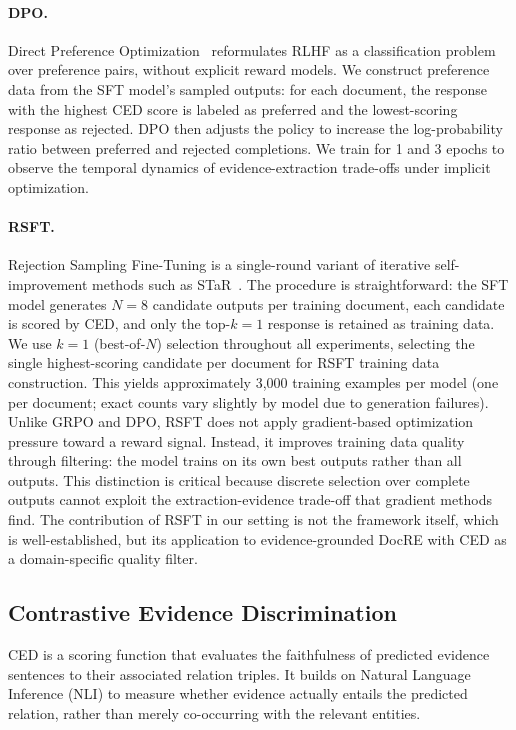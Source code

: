 \paragraph{DPO.}
Direct Preference Optimization~\citep{rafailov2023direct} reformulates RLHF as a classification problem over preference pairs, without explicit reward models. We construct preference data from the SFT model's sampled outputs: for each document, the response with the highest CED score is labeled as preferred and the lowest-scoring response as rejected. DPO then adjusts the policy to increase the log-probability ratio between preferred and rejected completions. We train for 1 and 3 epochs to observe the temporal dynamics of evidence-extraction trade-offs under implicit optimization.

\paragraph{RSFT.}
Rejection Sampling Fine-Tuning is a single-round variant of iterative self-improvement methods such as STaR~\citep{zelikman2022star}. The procedure is straightforward: the SFT model generates $N{=}8$ candidate outputs per training document, each candidate is scored by CED, and only the top-$k{=}1$ response is retained as training data. We use $k{=}1$ (best-of-$N$) selection throughout all experiments, selecting the single highest-scoring candidate per document for RSFT training data construction. This yields approximately 3,000 training examples per model (one per document; exact counts vary slightly by model due to generation failures). Unlike GRPO and DPO, RSFT does not apply gradient-based optimization pressure toward a reward signal. Instead, it improves training data quality through filtering: the model trains on its own best outputs rather than all outputs. This distinction is critical because discrete selection over complete outputs cannot exploit the extraction-evidence trade-off that gradient methods find. The contribution of RSFT in our setting is not the framework itself, which is well-established, but its application to evidence-grounded DocRE with CED as a domain-specific quality filter.


\subsection{Contrastive Evidence Discrimination}
\label{sec:ced}

CED is a scoring function that evaluates the faithfulness of predicted evidence sentences to their associated relation triples. It builds on Natural Language Inference (NLI) to measure whether evidence actually entails the predicted relation, rather than merely co-occurring with the relevant entities.


